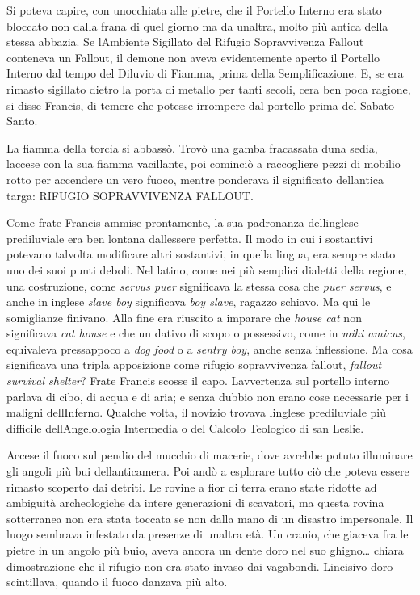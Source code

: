 Si poteva capire, con un\textquotesingle occhiata alle pietre, che il
Portello Interno era stato bloccato non dalla frana di quel giorno ma da
un\textquotesingle altra, molto più antica della stessa abbazia. Se
l\textquotesingle Ambiente Sigillato del Rifugio Sopravvivenza Fallout
conteneva un Fallout, il demone non aveva evidentemente aperto il
Portello Interno dal tempo del Diluvio di Fiamma, prima della
Semplificazione. E, se era rimasto sigillato dietro la porta di metallo
per tanti secoli, c\textquotesingle era ben poca ragione, si disse
Francis, di temere che potesse irrompere dal portello prima del Sabato
Santo.

La fiamma della torcia si abbassò. Trovò una gamba fracassata
d\textquotesingle una sedia, l\textquotesingle accese con la sua fiamma
vacillante, poi cominciò a raccogliere pezzi di mobilio rotto per
accendere un vero fuoco, mentre ponderava il significato
dell\textquotesingle antica targa: RIFUGIO SOPRAVVIVENZA FALLOUT.

Come frate Francis ammise prontamente, la sua padronanza
dell\textquotesingle inglese prediluviale era ben lontana
dall\textquotesingle essere perfetta. Il modo in cui i sostantivi
potevano talvolta modificare altri sostantivi, in quella lingua, era
sempre stato uno dei suoi punti deboli. Nel latino, come nei più
semplici dialetti della regione, una costruzione, come \emph{servus
	puer} significava la stessa cosa che \emph{puer servus}, e anche in
inglese \emph{slave boy} significava \emph{boy slave}, ragazzo schiavo.
Ma qui le somiglianze finivano. Alla fine era riuscito a imparare che
\emph{house cat} non significava \emph{cat house} e che un dativo di
scopo o possessivo, come in \emph{mihi amicus}, equivaleva pressappoco a
\emph{dog food} o a \emph{sentry boy}, anche senza inflessione. Ma cosa
significava una tripla apposizione come rifugio sopravvivenza fallout,
\emph{fallout survival shelter}? Frate Francis scosse il capo.
L\textquotesingle avvertenza sul portello interno parlava di cibo, di
acqua e di aria; e senza dubbio non erano cose necessarie per i maligni
dell\textquotesingle Inferno. Qualche volta, il novizio trovava
l\textquotesingle inglese prediluviale più difficile
dell\textquotesingle Angelologia Intermedia o del Calcolo Teologico di
san Leslie.

Accese il fuoco sul pendio del mucchio di macerie, dove avrebbe potuto
illuminare gli angoli più bui dell\textquotesingle anticamera. Poi andò
a esplorare tutto ciò che poteva essere rimasto scoperto dai detriti. Le
rovine a fior di terra erano state ridotte ad ambiguità archeologiche da
intere generazioni di scavatori, ma questa rovina sotterranea non era
stata toccata se non dalla mano di un disastro impersonale. Il luogo
sembrava infestato da presenze di un\textquotesingle altra età. Un
cranio, che giaceva fra le pietre in un angolo più buio, aveva ancora un
dente d\textquotesingle oro nel suo ghigno\ldots{} chiara dimostrazione
che il rifugio non era stato invaso dai vagabondi.
L\textquotesingle incisivo d\textquotesingle oro scintillava, quando il
fuoco danzava più alto.

